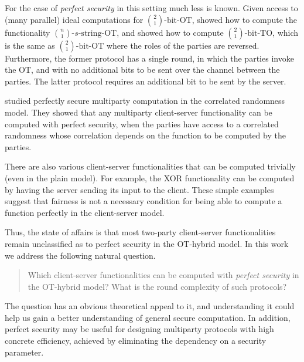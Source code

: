 \documentclass{llncs}
\newcommand{\bOT}[2]{\binom{#2}{#1}\text{-bit-OT}}
\newcommand{\TO}[2]{\binom{#2}{#1}\text{-bit-TO}}
\newcommand{\sOT}[3]{\binom{#2}{#1}\text{-}#3\text{-string-OT}}
\begin{document}
For the case of \emph{perfect security} in this setting much less is known. Given access to (many parallel) ideal computations for $\bOT12$, \citet{BCS96} showed how to compute the functionality $\sOT{1}{n}{s}$, and \citet{WolfW06} showed how to compute $\TO{1}{2}$, which is the same as $\bOT{1}{2}$ where the roles of the parties are reversed. Furthermore, the former protocol has a single round, in which the parties invoke the OT, and with no additional bits to be sent over the channel between the parties. The latter protocol requires an additional bit to be sent by the server. 

\citet{IKMOP13} studied perfectly secure multiparty computation in the correlated randomness model. They showed that any multiparty client-server functionality can be computed with perfect security, when the parties have access to a correlated randomness whose correlation depends on the function to be computed by the parties.

There are also various client-server functionalities that can be computed trivially (even in the plain model). For example, the XOR functionality can be computed by having the server sending its input to the client. These simple examples suggest that fairness is not a necessary condition for being able to compute a function perfectly in the client-server model.


Thus, the state of affairs is that most two-party client-server functionalities remain unclassified as to perfect security in the OT-hybrid model. In this work we address the following natural question.
\begin{quote}
Which client-server functionalities can be computed with \emph{perfect security} in the OT-hybrid model? What is the round complexity of such protocols?
\end{quote}
The question has an obvious theoretical appeal to it, and understanding it could help us gain a better understanding of general secure computation. In addition, perfect security may be useful for designing multiparty protocols with high concrete efficiency, achieved by eliminating the dependency on a security parameter.
\end{document}
